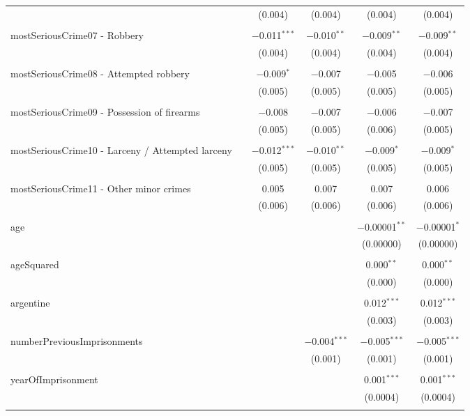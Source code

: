 \documentclass{article}
\begin{document}
\begin{table}[!htbp]
{\begin{tabular}{@{\extracolsep{5pt}}lccccc}
  &  & (0.004) & (0.004) & (0.004) & (0.004) \\ 
  & & & & & \\ 
 mostSeriousCrime07 - Robbery &  & $-$0.011$^{***}$ & $-$0.010$^{**}$ & $-$0.009$^{**}$ & $-$0.009$^{**}$ \\ 
  &  & (0.004) & (0.004) & (0.004) & (0.004) \\ 
  & & & & & \\ 
 mostSeriousCrime08 - Attempted robbery &  & $-$0.009$^{*}$ & $-$0.007 & $-$0.005 & $-$0.006 \\ 
  &  & (0.005) & (0.005) & (0.005) & (0.005) \\ 
  & & & & & \\ 
 mostSeriousCrime09 - Possession of firearms &  & $-$0.008 & $-$0.007 & $-$0.006 & $-$0.007 \\ 
  &  & (0.005) & (0.005) & (0.006) & (0.005) \\ 
  & & & & & \\ 
 mostSeriousCrime10 - Larceny / Attempted larceny &  & $-$0.012$^{***}$ & $-$0.010$^{**}$ & $-$0.009$^{*}$ & $-$0.009$^{*}$ \\ 
  &  & (0.005) & (0.005) & (0.005) & (0.005) \\ 
  & & & & & \\ 
 mostSeriousCrime11 - Other minor crimes &  & 0.005 & 0.007 & 0.007 & 0.006 \\ 
  &  & (0.006) & (0.006) & (0.006) & (0.006) \\ 
  & & & & & \\ 
 age &  &  &  & $-$0.00001$^{**}$ & $-$0.00001$^{*}$ \\ 
  &  &  &  & (0.00000) & (0.00000) \\ 
  & & & & & \\ 
 ageSquared &  &  &  & 0.000$^{**}$ & 0.000$^{**}$ \\ 
  &  &  &  & (0.000) & (0.000) \\ 
  & & & & & \\ 
 argentine &  &  &  & 0.012$^{***}$ & 0.012$^{***}$ \\ 
  &  &  &  & (0.003) & (0.003) \\ 
  & & & & & \\ 
 numberPreviousImprisonments &  &  & $-$0.004$^{***}$ & $-$0.005$^{***}$ & $-$0.005$^{***}$ \\ 
  &  &  & (0.001) & (0.001) & (0.001) \\ 
  & & & & & \\ 
 yearOfImprisonment &  &  &  & 0.001$^{***}$ & 0.001$^{***}$ \\ 
  &  &  &  & (0.0004) & (0.0004) \\ 
  & & & & & \\ 


\end{tabular}}
\end{table}
\end{document}
